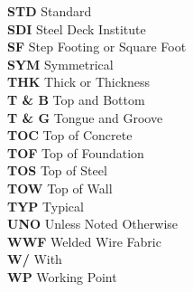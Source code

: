 \begin{tabbing}
    \indent\textbf{STD}      \>  {Standard}\\
    \indent\textbf{SDI}      \>  {Steel Deck Institute}\\
    \indent\textbf{SF}       \>  {Step Footing or Square Foot}\\
    \indent\textbf{SYM}      \>  {Symmetrical}\\
    \indent\textbf{THK}      \>  {Thick or Thickness}\\
    \indent\textbf{T \& B}   \>  {Top and Bottom}\\
    \indent\textbf{T \& G}   \>  {Tongue and Groove}\\
    \indent\textbf{TOC}      \>  {Top of Concrete}\\
    \indent\textbf{TOF}      \>  {Top of Foundation}\\
    \indent\textbf{TOS}      \>  {Top of Steel}\\
    \indent\textbf{TOW}      \>  {Top of Wall}\\
    \indent\textbf{TYP}      \>  {Typical}\\
    \indent\textbf{UNO}      \>  {Unless Noted Otherwise}\\
    \indent\textbf{WWF}      \>  {Welded Wire Fabric}\\
    \indent\textbf{W/}       \>  {With}\\
    \indent\textbf{WP}       \>  {Working Point}\\
\end{tabbing}

